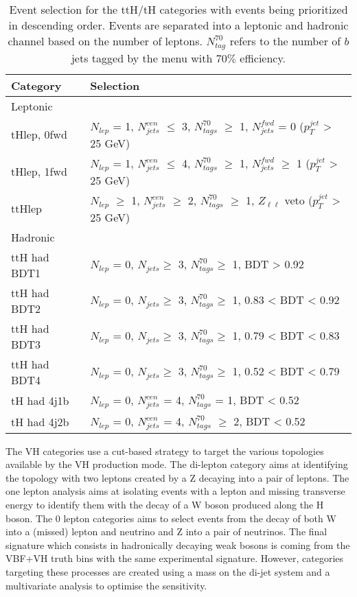 \begin{table}[h]
\centering
\begin{tabular}{|l|l|}
\hline
Category & Selection \\
\hline\hline
Leptonic &  \\ \hline
tHlep, 0fwd & $N_{lep}$ = 1, $N_{jets}^{cen}$ $\le$ 3, $N_{tags}^{70}$ $\ge$ 1, $N_{jets}^{fwd}$ = 0 ($p_T^{jet}$ > 25 GeV) \\
tHlep, 1fwd & $N_{lep}$ = 1, $N_{jets}^{cen}$ $\le$ 4, $N_{tags}^{70}$ $\ge$ 1, $N_{jets}^{fwd}$ $\ge$ 1 ($p_T^{jet}$ > 25 GeV) \\
ttHlep & $N_{lep}$ $\ge$ 1, $N_{jets}^{cen}$ $\ge$ 2, $N_{tags}^{70}$ $\ge$ 1, $Z_{\ell \ell}$ veto  ($p_T^{jet}$ > 25 GeV) \\ \hline
Hadronic &  \\ \hline
ttH had BDT1 & $N_{lep}$ = 0, $N_{jets} \geq$ 3,     $N_{tags}^{70} \geq$ 1, BDT > 0.92  \\
ttH had BDT2 & $N_{lep}$ = 0, $N_{jets} \geq$ 3,     $N_{tags}^{70} \geq$ 1, 0.83 < BDT < 0.92  \\
ttH had BDT3 & $N_{lep}$ = 0, $N_{jets} \geq$ 3,     $N_{tags}^{70} \geq$ 1, 0.79 < BDT < 0.83 \\
ttH had BDT4 & $N_{lep}$ = 0, $N_{jets} \geq$ 3,     $N_{tags}^{70} \geq$ 1, 0.52 < BDT < 0.79 \\ \hline
tH had 4j1b & $N_{lep}$ = 0, $N_{jets}^{cen}$ = 4,    $N_{tags}^{70}$ = 1, BDT < 0.52 \\
tH had 4j2b & $N_{lep}$ = 0, $N_{jets}^{cen}$ = 4,    $N_{tags}^{70}$ $\geq$ 2, BDT < 0.52 \\ \hline
\end{tabular}
\caption{Event selection for the ttH/tH categories with events being prioritized in descending order.
  Events are separated into a leptonic and hadronic channel based on the number of leptons.
  $N^{70}_{tag}$ refers to the number of $b$ jets tagged by the menu with $70\%$ efficiency.
  \cite{ATL-COM-PHYS-2016-1784}}
\label{tab:HGam_ttH_tH_cat}
\end{table}


The VH categories use a cut-based strategy to target the various topologies available by the VH production mode.
The di-lepton category aims at identifying the topology with two leptons created by a Z decaying into a pair of leptons.
The one lepton analysis aims at isolating events with a lepton and missing transverse energy to identify them with the decay of a W boson produced along the H boson.
The 0 lepton categories aims to select events from the decay of both W into a (missed) lepton and neutrino and Z into a pair of neutrinos.
The final signature which consists in hadronically decaying weak bosons is coming from the VBF+VH truth bins with the same experimental signature.
However, categories targeting these processes are created using a mass on the di-jet system and a multivariate analysis to optimise the sensitivity.

